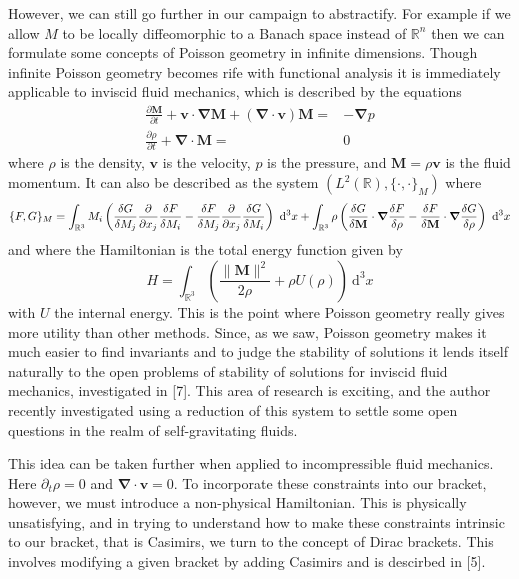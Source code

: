 \documentclass[psamsfonts,12pt]{amsart}
\newcommand\tv{\mathbf{v}}
\newcommand\td{\mathrm{d}}
\newcommand\0{\mathbf{0}}
\newcommand\grad{\boldsymbol{\nabla}}
\theoremstyle{plain}
\theoremstyle{definition}
\newcommand{\bM}{\mathbf{M}}
\newcommand{\bbR}{\mathbb{R}}
\begin{document}
However, we can still go further in our campaign to abstractify.  For example if we allow $M$ to be locally diffeomorphic to a Banach space instead of $\bbR^n$ then we can formulate some concepts of Poisson geometry in infinite dimensions.  Though infinite Poisson geometry becomes rife with functional analysis it is immediately applicable to inviscid fluid mechanics, which is described by the equations
\begin{align*}
\frac{\partial \bM}{\partial t}+\tv\cdot \grad \bM +(\grad \cdot \tv)\bM=&-\grad p\\
\frac{\partial \rho}{\partial t}+\grad \cdot \bM =& 0
\end{align*}
where $\rho$ is the density, $\tv$ is the velocity, $p$ is the pressure, and $\bM=\rho \tv$ is the fluid momentum.  It can also be described as the system $(L^2(\bbR), \{\cdot,\cdot\}_M)$ where
\[
\{F,G\}_M = \int_{\bbR^3}M_i \left(\frac{\delta G}{\delta M_j} \frac{\partial}{\partial x_j}\frac{\delta F}{\delta M_i}-\frac{\delta F}{\delta M_j}\frac{\partial}{\partial x_j}\frac{\delta G}{\delta M_i}\right) \ \td^3 x\\
+ \int_{\bbR^3} \rho\left(\frac{\delta G}{\delta \bM}\cdot \grad \frac{\delta F}{\delta \rho}-\frac{\delta F}{\delta \bM} \cdot \grad \frac{\delta G}{\delta \rho}\right) \ \td^3 x
\]
and where the Hamiltonian is the total energy function given by
\[
H = \int_{\bbR^3} \left(\frac{\|\bM\|^2}{2\rho}+\rho U(\rho)\right) \ \td^3 x
\]
with $U$ the internal energy.  This is the point where Poisson geometry really gives more utility than other methods.  Since, as we saw, Poisson geometry makes it much easier to find invariants and to judge the stability of solutions it lends itself naturally to the open problems of stability of solutions for inviscid fluid mechanics, investigated in [7].  This area of research is exciting, and the author recently investigated using a reduction of this system to settle some open questions in the realm of self-gravitating fluids.

This idea can be taken further when applied to incompressible fluid mechanics.  Here $\partial_t \rho=0$ and $\grad\cdot \tv=0$.  To incorporate these constraints into our bracket, however, we must introduce a non-physical Hamiltonian.  This is physically unsatisfying, and in trying to understand how to make these constraints intrinsic to our bracket, that is Casimirs, we turn to the concept of Dirac brackets.  This involves modifying a given bracket by adding Casimirs and is descirbed in [5].
\end{document}
